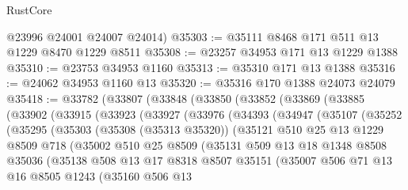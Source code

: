 \begin{lexlean}{RustCore}
\begin{coremodule}
      @23996
      @24001
      @24007
      @24014)
@35303 := @35111 @8468 @171 @511 @13 @1229 @8470 @1229 @8511
@35308 := @23257 @34953 @171 @13 @1229 @1388
@35310 := @23753 @34953 @1160
@35313 := @35310 @171 @13 @1388
@35316 := @24062 @34953 @1160 @13
@35320 := @35316 @170 @1388 @24073 @24079
@35418 := @33782
    (@33807
      (@33848
        (@33850
          (@33852
            (@33869
              (@33885
                (@33902
                  (@33915
                    (@33923
                      (@33927
                        (@33976
                          (@34393
                            (@34947
                              (@35107
                                (@35252
                                  (@35295
                                    (@35303
                                      (@35308 (@35313 @35320))
                                      (@35121
                                        @510
                                        @25
                                        @13
                                        @1229
                                        @8509
                                        @718
                                        (@35002
                                          @510
                                          @25
                                          @8509
                                          (@35131
                                            @509
                                            @13
                                            @18
                                            @1348
                                            @8508
                                            @35036
                                            (@35138
                                              @508
                                              @13
                                              @17
                                              @8318
                                              @8507
                                              @35151
                                              (@35007
                                                @506
                                                @71
                                                @13
                                                @16
                                                @8505
                                                @1243
                                                (@35160
                                                  @506
                                                  @13

\end{coremodule}
\end{lexlean}

